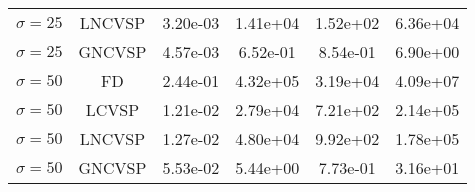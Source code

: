 \documentclass{article}
\begin{document}
\begin{tabular}{cccccc}
    $\sigma = 25$ & LNCVSP & 3.20e-03 & 1.41e+04 & 1.52e+02 & 6.36e+04 \\
    $\sigma = 25$ & GNCVSP & 4.57e-03 & 6.52e-01 & 8.54e-01 & 6.90e+00 \\
    \hline
    $\sigma = 50$ & FD & 2.44e-01 & 4.32e+05 & 3.19e+04 & 4.09e+07 \\
    $\sigma = 50$ & LCVSP & 1.21e-02 & 2.79e+04 & 7.21e+02 & 2.14e+05 \\
    $\sigma = 50$ & LNCVSP & 1.27e-02 & 4.80e+04 & 9.92e+02 & 1.78e+05 \\
    $\sigma = 50$ & GNCVSP & 5.53e-02 & 5.44e+00 & 7.73e-01 & 3.16e+01 \\
    \hline
\end{tabular}
\end{document}
